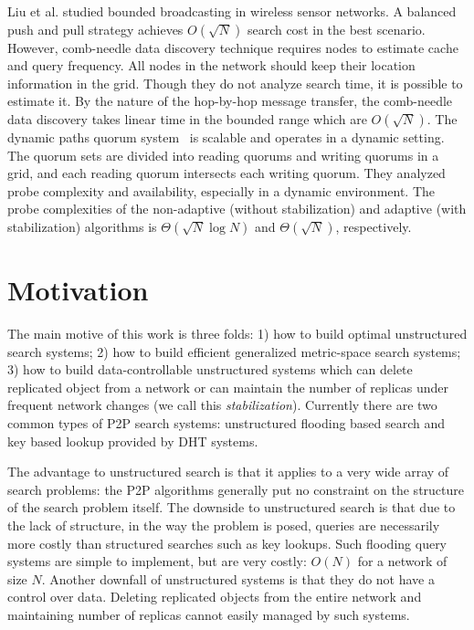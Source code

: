 \documentclass[9.5pt,journal,final,finalsubmission,twocolumn]{IEEEtran}
\begin{document}
Liu et al. \cite{LiuHZ04} studied bounded broadcasting in wireless sensor networks. 
A balanced push and pull strategy achieves $O(\sqrt N)$ search 
cost in the best scenario. However, comb-needle data discovery technique 
requires nodes to estimate cache and query frequency.
All nodes in the network should keep their location information in the grid. 
Though they do not analyze search time, it is possible to estimate it. By the
nature of the hop-by-hop message transfer, the comb-needle data discovery 
takes linear time in the bounded range which are $O(\sqrt N)$. 
The dynamic paths quorum system~\cite{Naor05} 
is scalable and operates in a dynamic setting. The quorum sets are 
divided into reading quorums and writing quorums in a grid, and each 
reading quorum intersects each writing quorum. They analyzed probe 
complexity and availability, especially in a dynamic environment. 
The probe complexities of the non-adaptive (without stabilization)
and adaptive (with stabilization) algorithms is 
$\Theta(\sqrt N \log N)$ and $\Theta(\sqrt N)$, respectively. 

\iffalse
\section{Motivation}\label{sec:motive}
The main motive of this work is three folds: 1) how to build optimal unstructured 
search systems; 2) how to build efficient generalized metric-space search systems;
3) how to build data-controllable unstructured systems which can delete replicated
object from a network or can maintain the number of replicas under frequent network 
changes (we call this \textit{stabilization}).
Currently there are two common types of P2P search systems: 
unstructured flooding based search and key based lookup provided by DHT systems.

The advantage to unstructured search is that it applies to a very wide array of 
search problems: the P2P algorithms generally put no constraint on 
the structure of the search problem itself. The downside to unstructured search is 
that due to the lack of structure, in the way the problem is posed, queries are 
necessarily more costly than structured searches such as key lookups.
Such flooding query systems are simple to implement, but
are very costly: $O(N)$ for a network of size $N$.
Another downfall of unstructured systems is that they do not have a control over 
data. Deleting replicated objects from the entire network and maintaining
number of replicas cannot easily managed by such systems.
\end{document}
